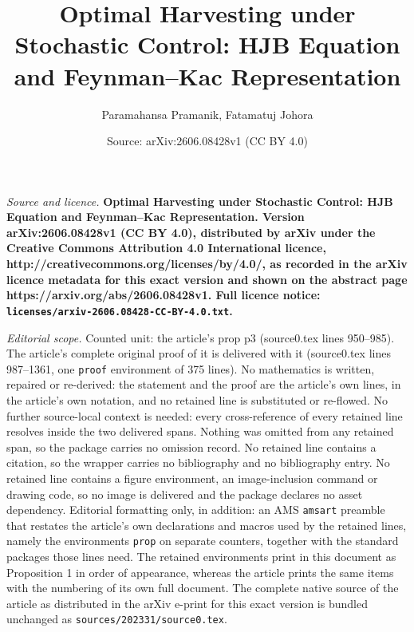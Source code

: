 \documentclass[10pt,a4paper]{amsart}
\title{\bfseries Optimal Harvesting under Stochastic Control: HJB Equation and Feynman–Kac Representation}
\author{Paramahansa Pramanik, Fatamatuj Johora}
\date{Source: arXiv:2606.08428v1 (CC BY 4.0)}
\begin{document}
\maketitle

\noindent\emph{Source and licence.} \bfseries Optimal Harvesting under Stochastic Control: HJB Equation and Feynman–Kac Representation. Version arXiv:2606.08428v1 (CC BY 4.0), distributed by arXiv under the Creative Commons Attribution 4.0 International licence, http://creativecommons.org/licenses/by/4.0/, as recorded in the arXiv licence metadata for this exact version and shown on the abstract page https://arxiv.org/abs/2606.08428v1. Full licence notice: \texttt{licenses/arxiv-2606.08428-CC-BY-4.0.txt}.\par\smallskip

\noindent\textit{Editorial scope.} Counted unit: the article's prop p3 (source0.tex lines 950--985). The article's complete original proof of it is delivered with it (source0.tex lines 987--1361, one \texttt{proof} environment of 375 lines). No mathematics is written, repaired or re-derived: the statement and the proof are the article's own lines, in the article's own notation, and no retained line is substituted or re-flowed.  No further source-local context is needed: every cross-reference of every retained line resolves inside the two delivered spans.  Nothing was omitted from any retained span, so the package carries no omission record.  No retained line contains a citation, so the wrapper carries no bibliography and no bibliography entry.  No retained line contains a figure environment, an image-inclusion command or drawing code, so no image is delivered and the package declares no asset dependency.  Editorial formatting only, in addition: an AMS \texttt{amsart} preamble that restates the article's own declarations and macros used by the retained lines, namely the environments \texttt{prop} on separate counters, together with the standard packages those lines need.  The retained environments print in this document as Proposition 1 in order of appearance, whereas the article prints the same items with the numbering of its own full document.  The complete native source of the article as distributed in the arXiv e-print for this exact version is bundled unchanged as \texttt{sources/202331/source0.tex}.
\end{document}
